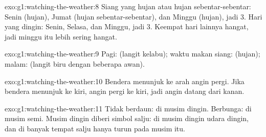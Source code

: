 \begin{solution}{exo:g1:watching-the-weather:8}
Siang yang hujan atau hujan sebentar-sebentar: Senin (hujan), Jumat (hujan
sebentar-sebentar), dan Minggu (hujan), jadi 3. Hari yang dingin: Senin,
Selasa, dan Minggu, jadi 3. Keempat hari lainnya hangat, jadi minggu itu
lebih sering hangat.
\end{solution}

\begin{solution}{exo:g1:watching-the-weather:9}
Pagi:  (langit kelabu); waktu makan siang:  (hujan);
malam:  (langit biru dengan beberapa awan).
\end{solution}

\begin{solution}{exo:g1:watching-the-weather:10}
Bendera menunjuk ke arah angin pergi. Jika bendera menunjuk ke kiri, angin
pergi ke kiri, jadi angin datang dari kanan.
\end{solution}

\begin{solution}{exo:g1:watching-the-weather:11}
Tidak berdaun: di musim dingin. Berbunga: di musim semi. Musim dingin
diberi simbol salju: di musim dingin udara dingin, dan di banyak tempat
salju hanya turun pada musim itu.
\end{solution}
